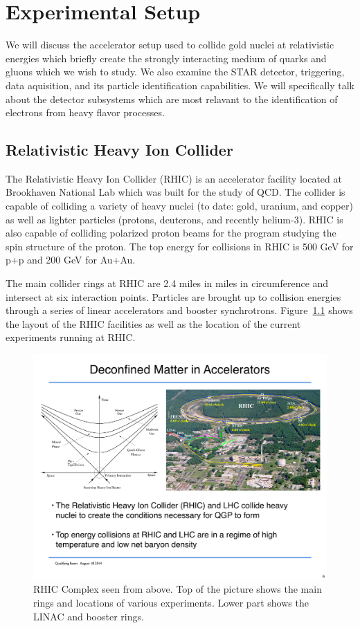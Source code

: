 \chapter{Experimental Setup}

We will discuss the accelerator setup used to collide gold nuclei at relativistic energies which briefly create the strongly interacting medium of quarks and gluons which we wish to study. We also examine the STAR detector, triggering, data aquisition, and its particle identification capabilities. We will specifically talk about the detector subsystems which are most relavant to the identification of electrons from heavy flavor processes. 

\section{Relativistic Heavy Ion Collider}

The Relativistic Heavy Ion Collider (RHIC) is an accelerator facility located at Brookhaven National Lab which was built for the study of QCD. The collider is capable of colliding a variety of heavy nuclei (to date: gold, uranium, and copper) as well as lighter particles (protons, deuterons, and recently helium-3). RHIC is also capable of colliding polarized proton beams for the program studying the spin structure of the proton. The top energy for collisions in RHIC is 500 GeV for p+p and 200 GeV for Au+Au. 

The main collider rings at RHIC are 2.4 miles in miles in circumference and intersect at six interaction points. Particles are brought up to collision energies through a series of linear accelerators and booster synchrotrons. Figure~\ref{fig:RHIC} shows the layout of the RHIC facilities as well as the location of the current experiments running at RHIC.

\begin{figure}[htbp]
\begin{center}
\includegraphics[scale=0.7]{Plots/Detector/RHIC_Complex.pdf}
\end{center}
\caption[RHIC Facility]{RHIC Complex seen from above. Top of the picture shows the main rings and locations of various experiments. Lower part shows the LINAC and booster rings.}
\label{fig:RHIC}
\end{figure}


